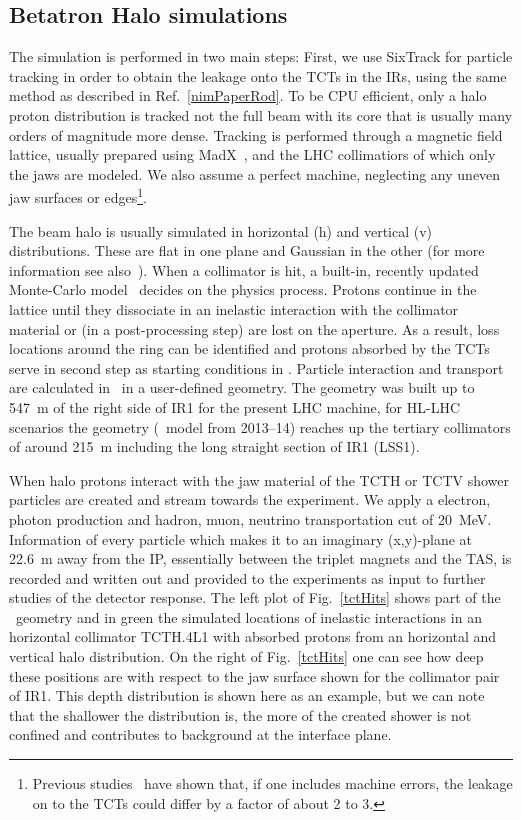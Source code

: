 \subsection{Betatron Halo simulations}
The simulation is performed in two main steps: First, we use SixTrack for particle tracking in order to obtain the leakage onto the TCTs in the IRs, using the same method as described in Ref.~\ref{nimPaperRod}. To be CPU efficient, only a halo proton distribution is tracked not the full beam with its core that is usually many orders of magnitude more dense. Tracking is performed through a magnetic field lattice, usually prepared using MadX~\cite{madx}, and the LHC collimatiors of which only the jaws are modeled. We also assume a perfect machine, neglecting any uneven jaw surfaces or edges\footnote{Previous studies~\cite{roderikSimMeasPaper} have shown that, if one includes machine errors, the leakage on to the TCTs could differ by a factor of about 2 to 3.}.

The beam halo is usually simulated in horizontal (h) and vertical (v) distributions. These are flat in one plane and Gaussian in the other (for more information see also~\cite{chiarasThesis}). When a collimator is hit, a built-in, recently updated Monte-Carlo model~\cite{claudiasThesis} decides on the physics process. Protons continue in the lattice until they dissociate in an inelastic interaction with the collimator material or (in a post-processing step) are lost on the aperture. As a result, loss locations around the ring can be identified and protons absorbed by the TCTs serve in second step as starting conditions in \fluka. Particle interaction and transport are calculated in \fluka~in a user-defined geometry. The geometry was built up to 547~m of the right side of IR1 for the present LHC machine, for HL-LHC scenarios the geometry (\fluka~model from 2013--14) reaches up the tertiary collimators of around 215~m including the long straight section of IR1 (LSS1).

When halo protons interact with the jaw material of the TCTH or TCTV shower particles are created and stream towards the experiment. We apply a electron, photon production and hadron, muon, neutrino transportation cut of 20~MeV. Information of every particle which makes it to an imaginary (x,y)-plane at 22.6~m away from the IP, essentially between the triplet magnets and the TAS, is recorded and written out and provided to the experiments as input to further studies of the detector response. The left plot of Fig.~\ref{tctHits} shows part of the \fluka~geometry and in green the simulated locations of inelastic interactions in an horizontal collimator TCTH.4L1 with absorbed protons from an horizontal and vertical halo distribution. On the right of Fig.~\ref{tctHits} one can see how deep these positions are with respect to the jaw surface shown for the collimator pair of IR1. This depth distribution is shown here as an example, but we can note that the shallower the distribution is, the more of the created shower is not confined and contributes to background at the interface plane.

